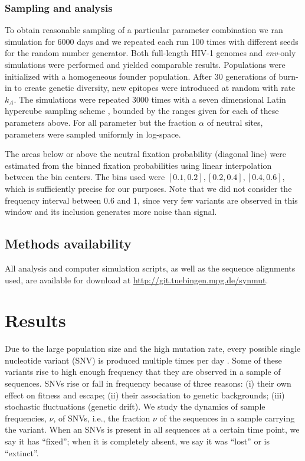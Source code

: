 \documentclass[11pt]{article}
\newcommand{\env}{\textit{env}}
\begin{document}
\subsubsection*{Sampling and analysis}
To obtain reasonable sampling of a particular parameter combination we
ran simulation for 6000 days and we repeated each run 100 times with
different seeds for the random number generator. Both full-length HIV-1
genomes and \env{}-only simulations were performed and yielded
comparable results. Populations were initialized with a homogeneous
founder population. After 30 generations of burn-in to create
genetic diversity, new epitopes were introduced at random with rate
$k_A$. The simulations were repeated 3000 times with a seven dimensional
Latin hypercube sampling scheme \citep{mckay_comparison_1979}, bounded by the ranges
given for each of these parameters above. For all parameter but the
fraction $\alpha$ of neutral sites,  parameters were sampled uniformly in
log-space. 

The areas below or above the neutral fixation probability (diagonal line) were
estimated from the binned fixation probabilities using linear interpolation
between the bin centers. The bins used were $[0.1, 0.2], [0.2, 0.4],
[0.4, 0.6]$, which is sufficiently precise for our purposes. Note that
we did not consider the frequency interval between 0.6 and 1, since very
few variants are observed in this window and its inclusion generates
more noise than signal.
 
\subsection*{Methods availability}
All analysis and computer simulation scripts, as well as the sequence alignments
used, are available for download at \url{http://git.tuebingen.mpg.de/synmut}.


\section*{Results}
Due to the large population size and the high mutation rate, every
possible single nucleotide variant (SNV) is produced multiple times per
day \citep{coffin_hiv_1995}. Some of these variants rise to high enough
frequency that they are observed in a sample of sequences. SNVs rise or fall in 
frequency because of three reasons: (i) their own effect on fitness and escape; (ii)
their association to genetic backgrounds; (iii) stochastic fluctuations
(genetic drift). We study the dynamics of sample frequencies, $\nu$, of SNVs,
i.e., the fraction $\nu$ of the sequences in a sample carrying
the variant. When an SNVs is present in all sequences 
at a certain time point, we say it has ``fixed''; when it is completely absent,
we say it was ``lost'' or is ``extinct''. 
\end{document}
